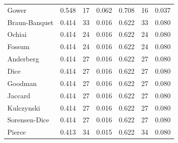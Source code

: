 \begin{table}[t]
{\begin{tabular}{lrrrrrr}
Gower & 0.548 & 17 & 0.062 & 0.708 & 16 & 0.037 \\
Braun-Banquet & 0.414 & 33 & 0.016 & 0.622 & 33 & 0.080 \\
Ochiai & 0.414 & 24 & 0.016 & 0.622 & 24 & 0.080 \\
Fossum & 0.414 & 24 & 0.016 & 0.622 & 24 & 0.080 \\
Anderberg & 0.414 & 27 & 0.016 & 0.622 & 27 & 0.080 \\
Dice & 0.414 & 27 & 0.016 & 0.622 & 27 & 0.080 \\
Goodman & 0.414 & 27 & 0.016 & 0.622 & 27 & 0.080 \\
Jaccard & 0.414 & 27 & 0.016 & 0.622 & 27 & 0.080 \\
Kulczynski & 0.414 & 27 & 0.016 & 0.622 & 27 & 0.080 \\
Sorensen-Dice & 0.414 & 27 & 0.016 & 0.622 & 27 & 0.080 \\
Pierce & 0.413 & 34 & 0.015 & 0.622 & 34 & 0.080 \\
\bottomrule
\end{tabular}
}
\end{table}
